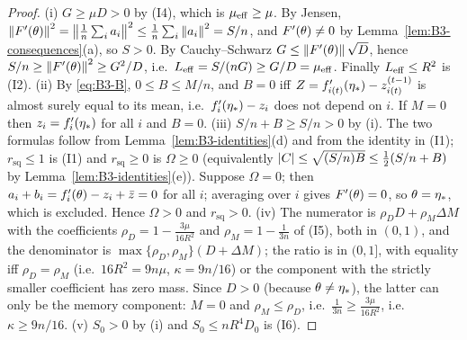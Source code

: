 \begin{proof}
(i) $G\ge\mu D>0$ by (I4), which is $\mu_{\mathrm{eff}}\ge\mu$. By Jensen, $\left\|F'(\theta)\right\|^2=\left\|\frac1n\sum_i a_i\right\|^2\le\frac1n\sum_i\left\|a_i\right\|^2=S/n$, and $F'(\theta)\ne0$ by Lemma~\ref{lem:B3-consequences}(a), so $S>0$. By Cauchy--Schwarz $G\le\left\|F'(\theta)\right\|\sqrt D$, hence $S/n\ge\left\|F'(\theta)\right\|^2\ge G^2/D$, i.e.\ $L_{\mathrm{eff}}=S/(nG)\ge G/D=\mu_{\mathrm{eff}}$. Finally $L_{\mathrm{eff}}\le R^2$ is (I2).
(ii) By \eqref{eq:B3-B}, $0\le B\le M/n$, and $B=0$ iff $Z=f'_{i(t)}(\eta_\ast)-z^{(t-1)}_{i(t)}$ is almost surely equal to its mean, i.e.\ $f'_i(\eta_\ast)-z_i$ does not depend on $i$. If $M=0$ then $z_i=f'_i(\eta_\ast)$ for all $i$ and $B=0$.
(iii) $S/n+B\ge S/n>0$ by (i). The two formulas follow from Lemma~\ref{lem:B3-identities}(d) and from the identity in (I1); $r_{\mathrm{sq}}\le1$ is (I1) and $r_{\mathrm{sq}}\ge0$ is $\Omega\ge0$ (equivalently $\left|C\right|\le\sqrt{(S/n)B}\le\frac12(S/n+B)$ by Lemma~\ref{lem:B3-identities}(e)). Suppose $\Omega=0$; then $a_i+b_i=f'_i(\theta)-z_i+\bar z=0$ for all $i$; averaging over $i$ gives $F'(\theta)=0$, so $\theta=\eta_\ast$, which is excluded. Hence $\Omega>0$ and $r_{\mathrm{sq}}>0$.
(iv) The numerator is $\rho_D D+\rho_M\Delta M$ with the coefficients $\rho_D=1-\frac{3\mu}{16R^2}$ and $\rho_M=1-\frac1{3n}$ of (I5), both in $(0,1)$, and the denominator is $\max\{\rho_D,\rho_M\}(D+\Delta M)$; the ratio is in $(0,1]$, with equality iff $\rho_D=\rho_M$ (i.e.\ $16R^2=9n\mu$, $\kappa=9n/16$) or the component with the strictly smaller coefficient has zero mass. Since $D>0$ (because $\theta\ne\eta_\ast$), the latter can only be the memory component: $M=0$ and $\rho_M\le\rho_D$, i.e.\ $\frac1{3n}\ge\frac{3\mu}{16R^2}$, i.e.\ $\kappa\ge9n/16$.
(v) $S_0>0$ by (i) and $S_0\le nR^4D_0$ is (I6).
\end{proof}

